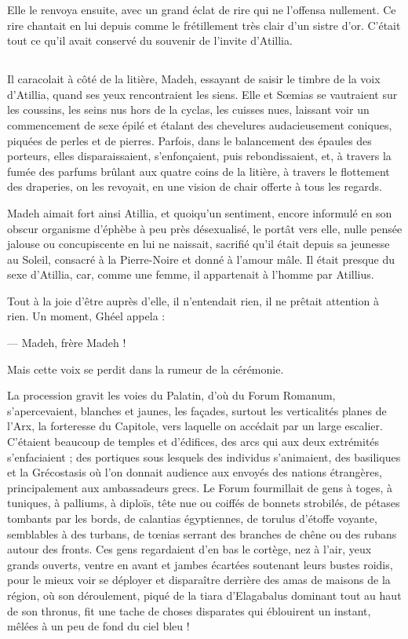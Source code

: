 \documentclass[a4paper, 11pt, oneside, polutonikogreek, french]{article}
\begin{document}
Elle le renvoya ensuite, avec un grand éclat de rire qui ne l'offensa nullement. Ce rire chantait en lui depuis comme le frétillement très clair d'un sistre d'or. C'était tout ce qu'il avait conservé du souvenir de l'invite d'Atillia.
\clearpage
\subsection{}
\paragraph{}
Il caracolait à côté de la litière, Madeh, essayant de saisir le timbre de la voix d'Atillia, quand ses yeux rencontraient les siens. Elle et Sœmias se vautraient sur les coussins, les seins nus hors de la cyclas, les cuisses nues, laissant voir un commencement de sexe épilé et étalant des chevelures audacieusement coniques, piquées de perles et de pierres. Parfois, dans le balancement des épaules des porteurs, elles disparaissaient, s'enfonçaient, puis rebondissaient, et, à travers la fumée des parfums brûlant aux quatre coins de la litière, à travers le flottement des draperies, on les revoyait, en une vision de chair offerte à tous les regards.

Madeh aimait fort ainsi Atillia, et quoiqu’un sentiment, encore informulé en son obscur organisme d'éphèbe à peu près désexualisé, le portât vers elle, nulle pensée jalouse ou concupiscente en lui ne naissait, sacrifié qu'il était depuis sa jeunesse au Soleil, consacré à la Pierre-Noire et donné à l'amour mâle. Il était presque du sexe d'Atillia, car, comme une femme, il appartenait à l'homme par Atillius.

Tout à la joie d'être auprès d'elle, il n'entendait rien, il ne prêtait attention à rien. Un moment, Ghéel appela :

--- Madeh, frère Madeh !

Mais cette voix se perdit dans la rumeur de la cérémonie.

La procession gravit les voies du Palatin, d'où du Forum Romanum, s'apercevaient, blanches et jaunes, les façades, surtout les verticalités planes de l'Arx, la forteresse du Capitole, vers laquelle on accédait par un large escalier. C'étaient beaucoup de temples et d'édifices, des arcs qui aux deux extrémités s'enfaciaient ; des portiques sous lesquels des individus s'animaient, des basiliques et la Grécostasis où l'on donnait audience aux envoyés des nations étrangères, principalement aux ambassadeurs grecs. Le Forum fourmillait de gens à toges, à tuniques, à palliums, à diploïs, tête nue ou coiffés de bonnets strobilés, de pétases tombants par les bords, de calantias égyptiennes, de torulus d'étoffe voyante, semblables à des turbans, de tœnias serrant des branches de chêne ou des rubans autour des fronts. Ces gens regardaient d'en bas le cortège, nez à l'air, yeux grands ouverts, ventre en avant et jambes écartées soutenant leurs bustes roidis, pour le mieux voir se déployer et disparaître derrière des amas de maisons de la région, où son déroulement, piqué de la tiara d'Elagabalus dominant tout au haut de son thronus, fit une tache de choses disparates qui éblouirent un instant, mêlées à un peu de fond du ciel bleu !
\end{document}
